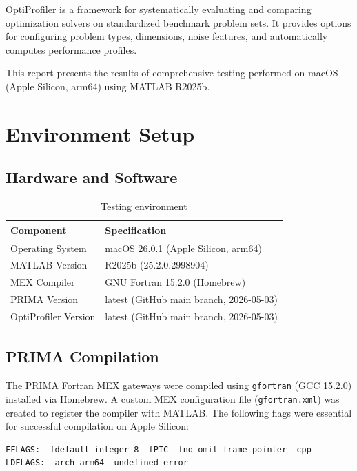 \documentclass[11pt,a4paper]{article}
\begin{document}
OptiProfiler is a framework for systematically evaluating and comparing
optimization solvers on standardized benchmark problem sets. It provides
options for configuring problem types, dimensions, noise features, and
automatically computes performance profiles.

This report presents the results of comprehensive testing performed on macOS
(Apple Silicon, arm64) using MATLAB R2025b.

\section{Environment Setup}

\subsection{Hardware and Software}

\begin{table}[H]
\centering
\caption{Testing environment}
\begin{tabular}{ll}
\toprule
\textbf{Component} & \textbf{Specification} \\
\midrule
Operating System & macOS 26.0.1 (Apple Silicon, arm64) \\
MATLAB Version   & R2025b (25.2.0.2998904) \\
MEX Compiler     & GNU Fortran 15.2.0 (Homebrew) \\
PRIMA Version    & latest (GitHub main branch, 2026-05-03) \\
OptiProfiler Version & latest (GitHub main branch, 2026-05-03) \\
\bottomrule
\end{tabular}
\end{table}

\subsection{PRIMA Compilation}

The PRIMA Fortran MEX gateways were compiled using \texttt{gfortran} (GCC 15.2.0)
installed via Homebrew. A custom MEX configuration file
(\texttt{gfortran.xml}) was created to register the compiler with MATLAB.
The following flags were essential for successful compilation on Apple Silicon:

\begin{verbatim}
FFLAGS: -fdefault-integer-8 -fPIC -fno-omit-frame-pointer -cpp
LDFLAGS: -arch arm64 -undefined error
\end{verbatim}
\end{document}
